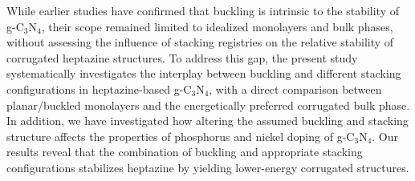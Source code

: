 While earlier studies have confirmed that buckling is intrinsic to the stability of g-C$_3$N$_4$, their scope remained limited to idealized monolayers and bulk phases, without assessing the influence of stacking registries on the relative stability of corrugated heptazine structures. To address this gap, the present study systematically investigates the interplay between buckling and different stacking configurations in heptazine-based g-C$_3$N$_4$, with a direct comparison between planar/buckled monolayers and the energetically preferred corrugated bulk phase. In addition, we have investigated how altering the assumed buckling and stacking structure affects the properties of phosphorus and nickel doping of g-C$_3$N$_4$. Our results reveal that the combination of buckling and appropriate stacking configurations stabilizes heptazine by yielding lower-energy corrugated structures.


